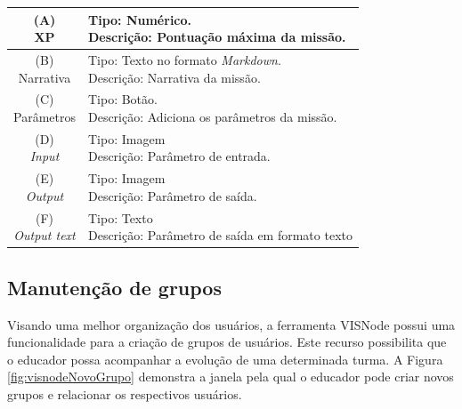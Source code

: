 \documentclass[
	12pt,				%
	oneside,			%
	a4paper,			%
	english,			%
	french,				%
	spanish,			%
	brazil,				%
	]{abntex2}
\begin{document}
\begin{table}[H]
\centering
{} \label{tab:manutencaoMissoes}
\renewcommand{\arraystretch}{1.8}
\setlength{\tabcolsep}{10pt}
\begin{tabular}{|c|l|}
  \hline
  \makecell{(A) \\ XP} 
  &
  \makecell[l]{Tipo: Numérico.\\ Descrição: Pontuação máxima da missão.} \\
  \hline
  \makecell{(B) \\ Narrativa} 
  &
  \makecell[l]{Tipo: Texto no formato \textit{Markdown}.\\ Descrição: Narrativa da missão.} \\
  \hline
  \makecell{(C) \\ Parâmetros} 
  &
  \makecell[l]{Tipo: Botão. \\ Descrição: Adiciona os parâmetros da missão.} \\
  \hline
  \makecell{(D) \\ \textit{Input}} 
  &
  \makecell[l]{Tipo: Imagem\\ Descrição: Parâmetro de entrada.} \\
  \hline
  \makecell{(E) \\ \textit{Output}} 
  &
  \makecell[l]{Tipo: Imagem\\ Descrição: Parâmetro de saída.} \\
  \hline  
  \makecell{(F) \\ \textit{Output text}} 
  &
  \makecell[l]{Tipo: Texto \\ Descrição: Parâmetro de saída em formato texto} \\
  \hline    
\end{tabular}
\centering
\sourceAuthor
\end{table}

\subsection{Manutenção de grupos}

Visando uma melhor organização dos usuários, a ferramenta VISNode possui uma funcionalidade para a criação de grupos de usuários. Este recurso possibilita que o educador possa acompanhar a evolução de uma determinada turma. A Figura \ref{fig:visnodeNovoGrupo} demonstra a janela pela qual o educador pode criar novos grupos e relacionar os respectivos usuários.
\end{document}

